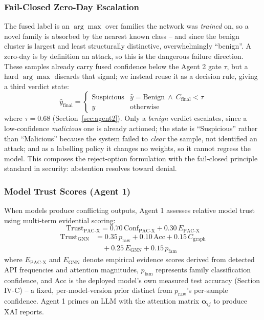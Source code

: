 \documentclass[conference]{IEEEtran}
\newcommand{\GateTau}{0.68}
\begin{document}
\subsubsection{Fail-Closed Zero-Day Escalation}
\label{sec:failclosed}
The fused label is an $\arg\max$ over families the network was \emph{trained} on, so a novel family is absorbed by the nearest known class -- and since the benign cluster is largest and least structurally distinctive, overwhelmingly ``benign''. A zero-day is by definition an attack, so this is the dangerous failure direction. These samples already carry fused confidence below the Agent 2 gate $\tau$, but a hard $\arg\max$ discards that signal; we instead reuse it as a decision rule, giving a third verdict state:
\begin{equation}
\label{eq:failclosed}
\hat{y}_{\text{final}} =
\begin{cases}
\text{Suspicious} & \hat{y} = \text{Benign} \ \wedge\ C_{\text{final}} < \tau \\
\hat{y} & \text{otherwise}
\end{cases}
\end{equation}
where $\tau = \GateTau$ (Section~\ref{sec:agent2}). Only a \emph{benign} verdict escalates, since a low-confidence \emph{malicious} one is already actioned; the state is ``Suspicious'' rather than ``Malicious'' because the system failed to \emph{clear} the sample, not identified an attack; and as a labelling policy it changes no weights, so it cannot regress the model. This composes the reject-option formulation \cite{b20} with the fail-closed principle standard in security: abstention resolves toward denial.

\subsubsection{Model Trust Scores (Agent 1)}
When models produce conflicting outputs, Agent 1 assesses relative model trust using multi-term evidential scoring:
\begin{equation}
\label{eq:trustpacx}
\text{Trust}_{\text{PAC-X}} = 0.70 \, \text{Conf}_{\text{PAC-X}} + 0.30 \, E_{\text{PAC-X}}
\end{equation}
\begin{equation}
\label{eq:trustgnn}
\begin{aligned}
\text{Trust}_{\text{GNN}} &= 0.35 \, p_{\text{raw}} + 0.10 \, \text{Acc} + 0.15 \, C_{\text{graph}} \\
&\quad + 0.25 \, E_{\text{GNN}} + 0.15 \, p_{\text{fam}}
\end{aligned}
\end{equation}
where $E_{\text{PAC-X}}$ and $E_{\text{GNN}}$ denote empirical evidence scores derived from detected API frequencies and attention magnitudes, $p_{\text{fam}}$ represents family classification confidence, and $\text{Acc}$ is the deployed model's own measured test accuracy (Section IV-C) -- a fixed, per-model-version prior distinct from $p_{\text{raw}}$'s per-sample confidence. Agent 1 primes an LLM with the attention matrix $\boldsymbol{\alpha}_{ij}$ to produce XAI reports.
\end{document}
